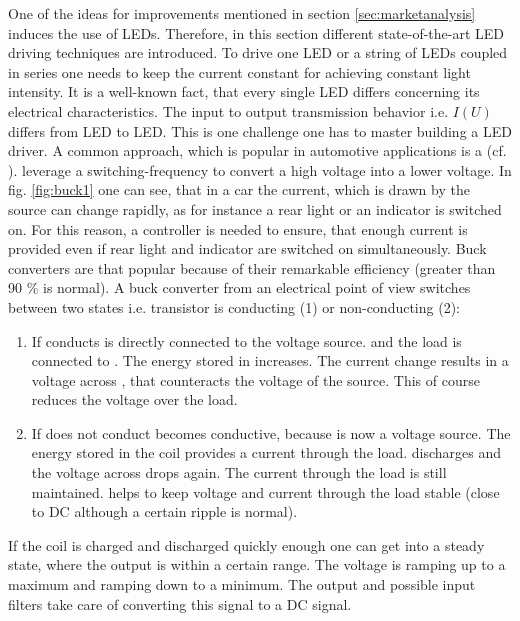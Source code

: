 One of the ideas for improvements mentioned in section \ref{sec:marketanalysis} induces the use of \glspl{LED}. Therefore, in this section different state-of-the-art \gls{LED} driving techniques are introduced. To drive one \gls{LED} or a string of \glspl{LED} coupled in series one needs to keep the current constant for achieving constant light intensity. It is a well-known fact, that every single \gls{LED} differs concerning its electrical characteristics. The input to output transmission behavior i.e. \ensuremath{I(U)} differs from \gls{LED} to \gls{LED}. This is one challenge one has to master building a \gls{LED} driver. 
\newpar
A common approach, which is popular in automotive applications is a  (cf. \cite{conference:buck1}).  leverage a switching-frequency to convert a high voltage into a lower voltage. In fig. \ref{fig:buck1} one can see, that in a car the current, which is drawn by the source can change rapidly, as for instance a rear light or an indicator is switched on. For this reason, a controller is needed to ensure, that enough current is provided even if rear light and indicator are switched on simultaneously. Buck converters are that popular because of their remarkable efficiency (greater than 90 \% is normal).
\newpar 
A buck converter from an electrical point of view switches between two states i.e. transistor  is conducting (1) or non-conducting (2): 
\begin{enumerate}
\item If  conducts  is directly connected to the voltage source.  and the load is connected to . The energy stored in  increases. The current change results in a voltage across , that counteracts the voltage of the source. This of course reduces the voltage over the load. 
\item If  does not conduct  becomes conductive, because  is now a voltage source. The energy stored in the coil provides a current through the load.  discharges and the voltage across  drops again. The current through the load is still maintained.  helps to keep voltage and current through the load stable (close to \gls{DC} although a certain ripple is normal).  
\end{enumerate}
If the coil is charged and discharged quickly enough one can get into a steady state, where the output is within a certain range. The voltage is ramping up to a maximum and ramping down to a minimum. The output and possible input filters take care of converting this signal to a \gls{DC} signal. 
